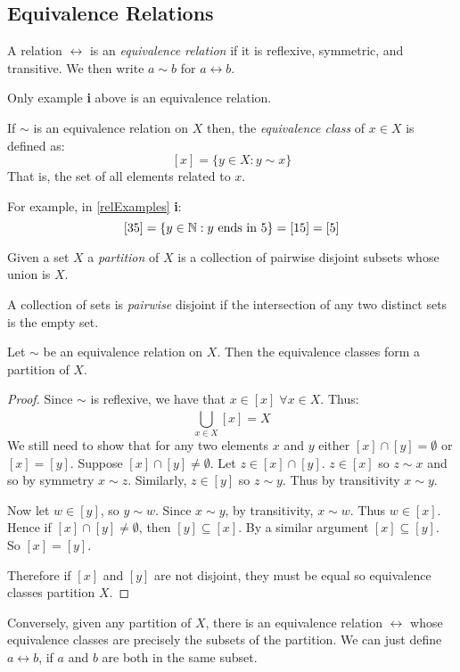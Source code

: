 \documentclass[../main.tex]{subfiles}
\begin{document}
\subsection{Equivalence Relations}
\begin{definition}
  A relation $\rel$ is an \textit{equivalence relation} if it is reflexive, symmetric, and transitive.
  We then write $a \sim b$ for $a \rel b$.
\end{definition}
Only example \textbf{i} above is an equivalence relation.
\begin{definition}
  If $\sim$ is an equivalence relation on $X$ then, the \textit{equivalence class} of $x \in X$ is defined as:
  \[
    [x] = \{y \in X: y \sim x\}
  \]
  That is, the set of all elements related to $x$.
\end{definition}
\begin{example}
  For example, in \cref{relExamples} \textbf{i}:
  \[
    [35] = \{y \in \mathbb{N} : y \text{ ends in 5}\} = [15] = [5]
  \]
\end{example}
\begin{definition}[Partition]
  Given a set $X$ a \textit{partition} of $X$ is a collection of pairwise disjoint subsets whose union is $X$.
\end{definition}
\begin{definition}
  A collection of sets is \textit{pairwise} disjoint if the intersection of any two distinct sets is the empty set.
\end{definition}
\begin{theorem}
  Let $\sim$ be an equivalence relation on $X$. Then the equivalence classes form a partition of $X$.
\end{theorem}
\begin{proof}
  Since $\sim$ is reflexive, we have that $x \in [x]\;\forall x \in X$. Thus:
  \[
    \bigcup_{x \in X}^{} [x] = X
  \]
  We still need to show that for any two elements $x$ and $y$ either $[x] \cap [y] = \emptyset$ or $[x] = [y]$.
  Suppose $[x] \cap [y] \neq \emptyset$.
  Let $z \in [x] \cap [y]$.
  $z \in [x]$ so $z \sim x$ and so by symmetry $x \sim z$.
  Similarly, $z \in [y]$ so $z \sim y$.
  Thus by transitivity $x \sim y$.

  Now let $w \in [y]$, so $y \sim w$.
  Since $x \sim y$, by transitivity, $x \sim w$.
  Thus $w \in [x]$.
  Hence if $[x] \cap [y] \neq \emptyset$, then $[y] \subseteq [x]$.
  By a similar argument $[x] \subseteq [y]$.
  So $[x] = [y]$.

  Therefore if $[x]$ and $[y]$ are not disjoint, they must be equal so equivalence classes partition $X$.
\end{proof}
Conversely, given any partition of $X$, there is an equivalence relation $\rel$ whose equivalence classes are precisely the subsets of the partition.
We can just define $a \rel b$, if $a$ and $b$ are both in the same subset.
\end{document}
